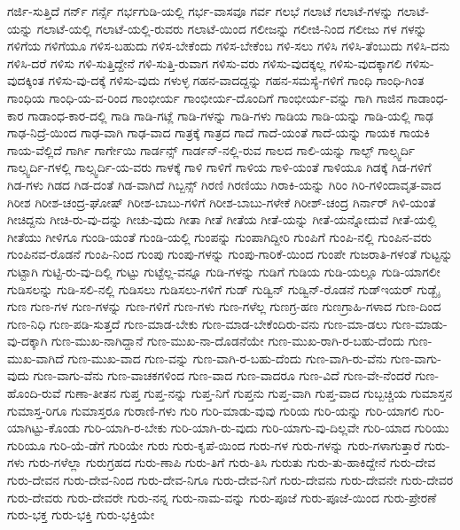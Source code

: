 {ಗರ್ಜಿ-ಸುತ್ತಿದೆ
ಗರ್ನ್
ಗರ್ನ್ಸೆ
ಗರ್ಭಗುಡಿ-ಯಲ್ಲಿ
ಗರ್ಭ-ವಾಸವೂ
ಗರ್ವ
ಗಲಭೆ
ಗಲಾಟೆ
ಗಲಾಟೆ-ಗಳನ್ನು
ಗಲಾಟೆ-ಯನ್ನು
ಗಲಾಟೆ-ಯಲ್ಲಿ
ಗಲಾಟೆ-ಯಲ್ಲಿ-ರುವರು
ಗಲಾಟೆ-ಯಿಂದ
ಗಲೀಜನ್ನು
ಗಲೀಜಿ-ನಿಂದ
ಗಲೀಜು
ಗಳ
ಗಳನ್ನು
ಗಳಿಗೆಯ
ಗಳಿಗೆಯೂ
ಗಳಿಸ-ಬಹುದು
ಗಳಿಸ-ಬೇಕೆಂದು
ಗಳಿಸ-ಬೇಕೆಂಬ
ಗಳಿ-ಸಲು
ಗಳಿಸಿ
ಗಳಿಸಿ-ತೆಂಬುದು
ಗಳಿಸಿ-ದನು
ಗಳಿಸಿ-ದರೆ
ಗಳಿಸು
ಗಳಿ-ಸುತ್ತಿದ್ದೇನೆ
ಗಳಿ-ಸುತ್ತಿ-ರುವಾಗ
ಗಳಿಸು-ವರು
ಗಳಿಸು-ವುದಕ್ಕಲ್ಲ
ಗಳಿಸು-ವುದಕ್ಕಾಗಲಿ
ಗಳಿಸು-ವುದಕ್ಕಿಂತ
ಗಳಿಸು-ವು-ದಕ್ಕೆ
ಗಳಿಸು-ವುದು
ಗಳುಳ್ಳ
ಗಹನ-ವಾದದ್ದನ್ನು
ಗಹನ-ಸಮಸ್ಯೆ-ಗಳಿಗೆ
ಗಾಂಧಿ
ಗಾಂಧಿ-ಗಿಂತ
ಗಾಂಧಿಯ
ಗಾಂಧಿ-ಯ-ವ-ರಿಂದ
ಗಾಂಭೀರ್ಯ
ಗಾಂಭೀರ್ಯ-ದೊಂದಿಗೆ
ಗಾಂಭೀರ್ಯ-ವನ್ನು
ಗಾಗಿ
ಗಾಜಿನ
ಗಾಡಾಂಧ-ಕಾರ
ಗಾಡಾಂಧ-ಕಾರ-ದಲ್ಲಿ
ಗಾಡಿ
ಗಾಡಿ-ಗಟ್ಲೆ
ಗಾಡಿ-ಗಳನ್ನು
ಗಾಡಿ-ಗಳು
ಗಾಡಿಯ
ಗಾಡಿ-ಯನ್ನು
ಗಾಡಿ-ಯಲ್ಲಿ
ಗಾಢ
ಗಾಢ-ನಿದ್ರೆ-ಯಿಂದ
ಗಾಢ-ವಾಗಿ
ಗಾಢ-ವಾದ
ಗಾತ್ರಕ್ಕೆ
ಗಾತ್ರದ
ಗಾದೆ
ಗಾದೆ-ಯಂತೆ
ಗಾದೆ-ಯನ್ನು
ಗಾಯಕ
ಗಾಯಕಿ
ಗಾಯ-ವೆಲ್ಲಿದೆ
ಗಾರ್ಗಿ
ಗಾರ್ಗೇಯಿ
ಗಾರ್ಡನ್ಸ್
ಗಾರ್ಡನ್-ನಲ್ಲಿ-ರುವ
ಗಾಲದ
ಗಾಲಿ-ಯನ್ನು
ಗಾಲ್ಫ್
ಗಾಲ್ಸ್ವರ್ದಿ
ಗಾಲ್ಸ್ವರ್ದಿ-ಗಳಲ್ಲಿ
ಗಾಲ್ಸ್ವರ್ದಿ-ಯ-ವರು
ಗಾಳಕ್ಕೆ
ಗಾಳಿ
ಗಾಳಿಗೆ
ಗಾಳಿಯ
ಗಾಳಿ-ಯಂತೆ
ಗಾಳಿಯೂ
ಗಿಡಕ್ಕೆ
ಗಿಡ-ಗಳಿಗೆ
ಗಿಡ-ಗಳು
ಗಿಡದ
ಗಿಡ-ದಂತೆ
ಗಿಡ-ವಾಗಿದೆ
ಗಿಬ್ಬನ್ಸ್
ಗಿರಣಿ
ಗಿರಣಿಯು
ಗಿರಾಕಿ-ಯನ್ನು
ಗಿರಿಂ
ಗಿರಿ-ಗಳಿಂದಾವೃತ-ವಾದ
ಗಿರೀಶ
ಗಿರೀಶ-ಚಂದ್ರ-ಘೋಷ್
ಗಿರೀಶ-ಬಾಬು-ಗಳಿಗೆ
ಗಿರೀಶ-ಬಾಬು-ಗಳೇಕೆ
ಗಿರೀಶ್-ಚಂದ್ರ
ಗಿರ್ನಾರ್
ಗಿಳಿ-ಯಂತೆ
ಗೀಚಿದ್ದನು
ಗೀಚಿ-ರು-ವು-ದನ್ನು
ಗೀಚು-ವುದು
ಗೀತಾ
ಗೀತೆ
ಗೀತೆಯ
ಗೀತೆ-ಯನ್ನು
ಗೀತೆ-ಯನ್ನೋದುವೆ
ಗೀತೆ-ಯಲ್ಲಿ
ಗೀತೆಯು
ಗೀಳಿಗೂ
ಗುಂಡಿ-ಯಂತೆ
ಗುಂಡಿ-ಯಲ್ಲಿ
ಗುಂಪನ್ನು
ಗುಂಪಾಗಿದ್ದೀರಿ
ಗುಂಪಿಗೆ
ಗುಂಪಿ-ನಲ್ಲಿ
ಗುಂಪಿನ-ವರು
ಗುಂಪಿನವ-ರೊಡನೆ
ಗುಂಪಿ-ನಿಂದ
ಗುಂಪು
ಗುಂಪು-ಗಳನ್ನು
ಗುಂಪು-ಗಾರಿಕೆ-ಯಿಂದ
ಗುಂಪೇ
ಗುಜರಾತಿ-ಗಳಂತೆ
ಗುಟ್ಟನ್ನು
ಗುಟ್ಟಾಗಿ
ಗುಟ್ಟಿ-ರು-ವು-ದಿಲ್ಲಿ
ಗುಟ್ಟು
ಗುಟ್ಟೆಲ್ಲ-ವನ್ನೂ
ಗುಡಿ-ಗಳನ್ನು
ಗುಡಿಗೆ
ಗುಡಿಯ
ಗುಡಿ-ಯಲ್ಲೂ
ಗುಡಿ-ಯಾಗಲೀ
ಗುಡಿಸಲನ್ನು
ಗುಡಿ-ಸಲಿ-ನಲ್ಲಿ
ಗುಡಿಸಲು
ಗುಡಿಸಲು-ಗಳಿಗೆ
ಗುಡ್
ಗುಡ್ವಿನ್
ಗುಡ್ವಿನ್-ರೊಡನೆ
ಗುಡ್ಇಯರ್
ಗುಡ್ಬೈ
ಗುಣ
ಗುಣ-ಗಳ
ಗುಣ-ಗಳನ್ನು
ಗುಣ-ಗಳಿಗೆ
ಗುಣ-ಗಳು
ಗುಣ-ಗಳೆಲ್ಲ
ಗುಣಗ್ರ-ಹಣ
ಗುಣಗ್ರಾಹಿ-ಗಳಾದ
ಗುಣ-ದಿಂದ
ಗುಣ-ನಿಧಿ
ಗುಣ-ಪಡಿ-ಸುತ್ತದೆ
ಗುಣ-ಮಾಡ-ಬೇಕು
ಗುಣ-ಮಾಡ-ಬೇಕೆಂದಿರು-ವನು
ಗುಣ-ಮಾ-ಡಲು
ಗುಣ-ಮಾಡು-ವು-ದಕ್ಕಾಗಿ
ಗುಣ-ಮುಖ-ನಾಗಿದ್ದಾನೆ
ಗುಣ-ಮುಖ-ನಾ-ದೊಡನೆಯೇ
ಗುಣ-ಮುಖ-ರಾಗಿ-ರ-ಬಹು-ದೆಂದು
ಗುಣ-ಮುಖ-ವಾಗಿದೆ
ಗುಣ-ಮುಖ-ವಾದ
ಗುಣ-ವನ್ನು
ಗುಣ-ವಾಗಿ-ರ-ಬಹು-ದೆಂದು
ಗುಣ-ವಾಗಿ-ರು-ವೆನು
ಗುಣ-ವಾಗು-ವುದು
ಗುಣ-ವಾಗು-ವೆನು
ಗುಣ-ವಾಚಕಗಳಿಂದ
ಗುಣ-ವಾದ
ಗುಣ-ವಾದರೂ
ಗುಣ-ವಿದೆ
ಗುಣ-ವೇ-ನೆಂದರೆ
ಗುಣ-ಹೊಂದಿ-ರುವೆ
ಗುಣಾ-ತೀತನ
ಗುಪ್ತ
ಗುಪ್ತ-ನನ್ನು
ಗುಪ್ತ-ನಿಗೆ
ಗುಪ್ತನು
ಗುಪ್ತ-ವಾಗಿ
ಗುಪ್ತ-ವಾದ
ಗುಬ್ಬಚ್ಚಿಯ
ಗುಮಾಸ್ತನ
ಗುಮಾಸ್ತ-ರಿಗೂ
ಗುಮಾಸ್ತರೂ
ಗುರಾಣಿ-ಗಳು
ಗುರಿ
ಗುರಿ-ಮಾಡು-ವುವು
ಗುರಿಯ
ಗುರಿ-ಯನ್ನು
ಗುರಿ-ಯಾಗಲಿ
ಗುರಿ-ಯಾಗಿಟ್ಟು-ಕೊಂಡು
ಗುರಿ-ಯಾಗಿ-ರ-ಬೇಕು
ಗುರಿ-ಯಾಗಿ-ರು-ವುದು
ಗುರಿ-ಯಾಗು-ವು-ದಿಲ್ಲವೇ
ಗುರಿ-ಯಾದ
ಗುರಿಯು
ಗುರಿಯೂ
ಗುರಿ-ಯೆ-ಡೆಗೆ
ಗುರಿಯೇ
ಗುರು
ಗುರು-ಕೃಪೆ-ಯಿಂದ
ಗುರು-ಗಳ
ಗುರು-ಗಳನ್ನು
ಗುರು-ಗಳಾಗುತ್ತಾರೆ
ಗುರು-ಗಳು
ಗುರು-ಗಳೆಲ್ಲಾ
ಗುರುಗ್ರಹದ
ಗುರು-ಣಾಪಿ
ಗುರು-ತಿಗೆ
ಗುರು-ತಿಸಿ
ಗುರುತು
ಗುರು-ತು-ಹಾಕಿದ್ದೇನೆ
ಗುರು-ದೇವ
ಗುರು-ದೇವನ
ಗುರು-ದೇವ-ನಿಂದ
ಗುರು-ದೇವ-ನಿಗೂ
ಗುರು-ದೇವ-ನಿಗೆ
ಗುರು-ದೇವನು
ಗುರು-ದೇವನೇ
ಗುರು-ದೇವರ
ಗುರು-ದೇವರು
ಗುರು-ದೇವರೇ
ಗುರು-ನನ್ನ
ಗುರು-ನಾಮ-ವನ್ನು
ಗುರು-ಪೂಜೆ
ಗುರು-ಪೂಜೆ-ಯಿಂದ
ಗುರು-ಪ್ರೇರಣೆ
ಗುರು-ಭಕ್ತ
ಗುರು-ಭಕ್ತಿ
ಗುರು-ಭಕ್ತಿಯೇ
}
